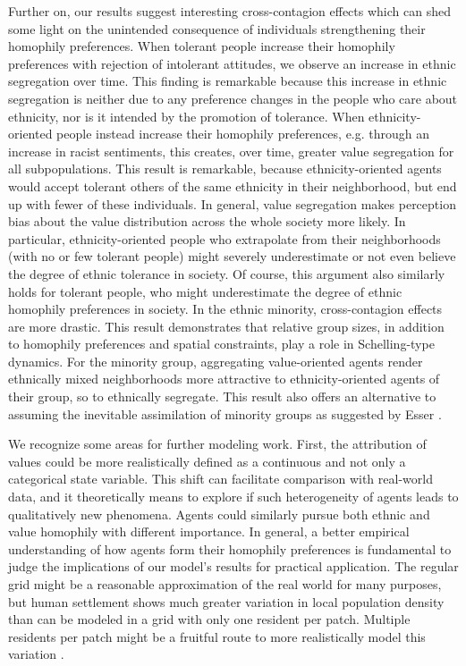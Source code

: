 \documentclass{ws-acs}
\begin{document}
{Further on, our results suggest interesting cross-contagion effects which can shed some light on the unintended consequence of individuals strengthening their homophily preferences. 
When tolerant people increase their homophily preferences with rejection of intolerant attitudes, we observe an increase in ethnic segregation over time. This finding is remarkable because this increase in ethnic segregation is neither due to any preference changes in the people who care about ethnicity, nor is it intended by the promotion of tolerance.
When ethnicity-oriented people instead increase their homophily preferences, e.g. through an increase in racist sentiments, this creates, over time, greater value segregation for all subpopulations. This result is remarkable, because ethnicity-oriented agents would accept tolerant others of the same ethnicity in their neighborhood, but end up with fewer of these individuals. 
In general, value segregation makes perception bias about the value distribution across the whole society more likely. In particular, ethnicity-oriented people who extrapolate from their neighborhoods (with no or few tolerant people) might severely underestimate or not even believe the degree of ethnic tolerance in society. Of course, this argument  also similarly holds for tolerant people, who might underestimate the degree of ethnic homophily preferences in society. 
In the ethnic minority, cross-contagion effects are more drastic. This result demonstrates that relative group sizes, in addition to homophily preferences and spatial constraints, play a role in Schelling-type dynamics. For the minority group, aggregating value-oriented agents render ethnically mixed neighborhoods more attractive to ethnicity-oriented agents of their group, so to ethnically segregate. This result also offers an alternative to assuming the inevitable assimilation of minority groups as suggested by Esser \cite{Esser2010}.

We recognize some areas for further modeling work. First, the attribution of values could be more realistically defined as a continuous and not only a categorical state variable. This shift can facilitate comparison with real-world data, and it theoretically means to explore if such heterogeneity of agents leads to qualitatively new phenomena. Agents could similarly pursue both ethnic and value homophily with different importance. In general, a better empirical understanding of how agents form their homophily preferences is fundamental to judge the implications of our model's results for practical application.
The regular grid might be a reasonable approximation of the real world for many purposes, but human settlement shows much greater variation in local population density than can be modeled in a grid with only one resident per patch. Multiple residents per patch might be a fruitful route to more realistically model this variation \cite{GargiuloGandicaea2017EmergentDenseSuburbs}. 

}
\end{document}
